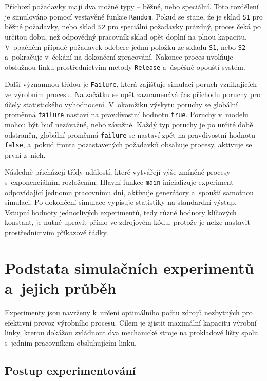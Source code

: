 \documentclass[a4paper, 11pt]{article}
\begin{document}
Příchozí požadavky mají dva možné typy -- běžné, nebo speciální.
Toto rozdělení je simulováno pomocí vestavěné funkce \texttt{Random}.
Pokud se stane, že je sklad \texttt{S1} pro běžné požadavky, nebo sklad \texttt{S2} pro speciální požadavky prázdný, proces čeká po určitou dobu, než odpovědný pracovník sklad opět doplní na plnou kapacitu.
V~opačném případě požadavek odebere jednu položku ze skladu \texttt{S1}, nebo \texttt{S2} a~pokračuje v~čekání na dokončení zpracování.
Nakonec proces uvolňuje obslužnou linku prostřednictvím metody \texttt{Release} a~úspěšně opouští systém.

Další významnou třídou je \texttt{Failure}, která zajišťuje simulaci poruch vznikajících ve výrobním procesu.
Na začátku se opět zaznamenává čas příchodu poruchy pro účely statistického vyhodnocení.
V~okamžiku výskytu poruchy se globální proměnná \texttt{failure} nastaví na pravdivostní hodnotu \texttt{true}.
Poruchy v~modelu mohou být buď nezávažné, nebo závažné.
Každý typ poruchy je po určité době odstraněn, globální proměnná \texttt{failure} se nastaví zpět na pravdivostní hodnotu \texttt{false}, a~pokud fronta pozastavených požadavků obsahuje procesy, aktivuje se první z~nich.

Následně přicházejí třídy událostí, které vytvářejí výše zmíněné procesy s~exponenciálním rozložením.
Hlavní funkce \texttt{main} inicializuje experiment odpovídající jednomu pracovnímu dni, aktivuje generátory a~spouští samotnou simulaci.
Po dokončení simulace vypisuje statistiky na standardní výstup.
Vstupní hodnoty jednotlivých experimentů, tedy různé hodnoty klíčových konstant, je nutné upravit přímo ve zdrojovém kódu, protože je nelze nastavit prostřednictvím příkazové řádky.

\newpage

\section{Podstata simulačních experimentů a~jejich průběh}

Experimenty jsou navrženy k~určení optimálního počtu zdrojů nezbytných pro efektivní provoz výrobního procesu.
Cílem je zjistit maximální kapacitu výrobní linky, kterou dokážou zvládnout dva mechanické stroje na prokladové lišty spolu s~jedním pracovníkem obsluhujícím linku.

\subsection{Postup experimentování}
\end{document}
